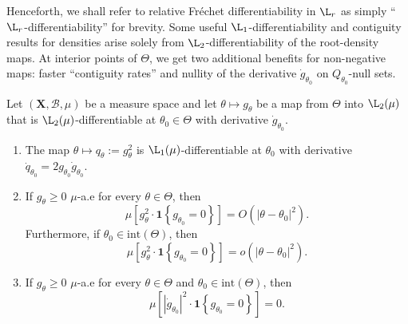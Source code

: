 Henceforth, we shall refer to relative Fr\'echet differentiability in
\(\L_{r}\) as simply ``\(\L_{r}\)-differentiability'' for
brevity.
Some useful \(\L_{1}\)-differentiability and contiguity results for
densities arise solely from \(\L_{2}\)-differentiability of the
root-density maps.
At interior points of \(\Theta\), we get two additional benefits for
non-negative maps:
faster ``contiguity rates'' and nullity of the derivative
\(\dot{g}_{\theta_{0}}\) on \(Q_{\theta_{0}}\)-null sets.

\begin{lemma}
\label{lem--hellinger-diff-properties}
Let \((\mathbf{X}, \mathcal{B}, \mu)\) be a measure space and let \(\theta
\mapsto g_{\theta}\) be a map from \(\Theta\) into \(\L_{2} (\mu)\)
that is \(\L_{2} (\mu)\)-differentiable at
\(\theta_{0} \in \Theta\) with derivative \(\dot{g}_{\theta_{0}}\).
\begin{enumerate}[label=(\alph*)]
  \item \label{lem--hellinger-diff-properties-q-diff-in-L1}
    The map \(\theta \mapsto q_{\theta} := g_{\theta}^{2}\) is \(\L_{1}
    (\mu)\)-differentiable at \(\theta_{0}\) with derivative \(\dot{q}_{\theta_{0}} = 2
    g_{\theta_{0}} \dot{g}_{\theta_{0}}\).
  \item \label{lem--hellinger-diff-properties-q-singularity-result}
    If \(g_{\theta} \geq 0\) \(\mu\)-a.e for every \(\theta \in \Theta\), then
    \begin{equation}
      \mu \left[ g_{\theta}^{2} \cdot \mathbf{1} \left\{ g_{\theta_{0}} = 0
      \right\} \right] = O \left( |\theta - \theta_{0}|^{2} \right).
      \label{eqn--hellinger-diff-properties-q-singularity-result-1}
    \end{equation}
    Furthermore, if \(\theta_{0} \in \mathrm{int} (\Theta)\), then
    \begin{equation}
      \mu \left[ g_{\theta}^{2} \cdot \mathbf{1} \left\{ g_{\theta_{0}} = 0
      \right\} \right] = o \left( |\theta - \theta_{0}|^{2} \right).
      \label{eqn--hellinger-diff-properties-q-singularity-result}
    \end{equation}
  \item \label{lem--hellinger-diff-properties-dotg-singularity-result}
    If \(g_{\theta} \geq 0\) \(\mu\)-a.e for every \(\theta \in \Theta\) and
    \(\theta_{0} \in \mathrm{int} (\Theta)\), then
    \begin{equation}
      \mu \left[ \left| \dot{g}_{\theta_{0}} \right|^{2} \cdot \mathbf{1}
      \left\{ g_{\theta_{0}} = 0 \right\} \right] = 0.
      \label{eqn--hellinger-diff-properties-gdot-singularity-result}
    \end{equation}
\end{enumerate}
\end{lemma}

